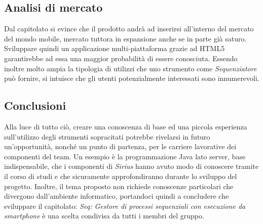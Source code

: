 \subsection{Analisi di mercato}
Dal capitolato si evince che il prodotto andrà ad inserirsi all'interno del mercato del mondo mobile, mercato tuttora in espansione anche se in parte già saturo. Sviluppare quindi un applicazione multi-piattaforma grazie ad HTML5 garantirebbe ad essa una maggior probabilità di essere conosciuta.
Essendo inoltre molto ampia la tipologia di utilizzi che uno strumento come \textit{Sequenziatore} può fornire, si intuisce che gli utenti potenzialmente interessati sono innumerevoli.

\subsection{Conclusioni}
Alla luce di tutto ciò, creare una conoscenza di base ed una piccola esperienza sull'utilizzo degli strumenti sopracitati potrebbe rivelarsi in futuro un'opportunità, nonché un punto di partenza, per le carriere lavorative dei componenti del team. Un esempio è la programmazione Java lato server, base indispensabile, che i componenti di \textit{Sirius} hanno avuto modo di conoscere tramite il corso di studi e che sicuramente approfondiranno durante lo sviluppo del progetto. Inoltre, il tema proposto non richiede conoscenze particolari che divergono dall'ambiente informatico, portandoci quindi a concludere che sviluppare il capitolato: \textit{Seq: Gestore di processi sequenziali con esecuzione da smartphone} è una scelta condivisa da tutti i membri del gruppo. \\